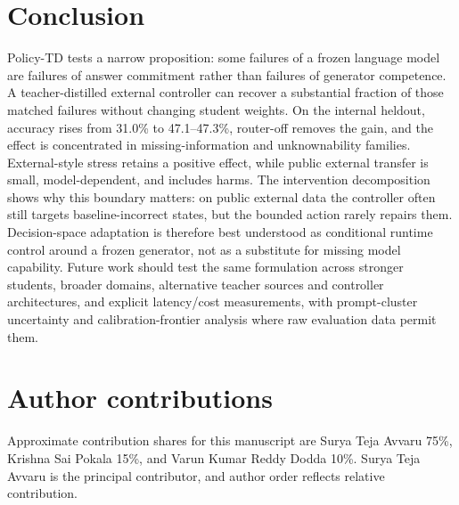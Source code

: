 \documentclass[11pt]{article}
\newcommand{\policytd}{Policy-TD}
\begin{document}
\section{Conclusion}
\policytd{} tests a narrow proposition: some failures of a frozen language model are failures of answer commitment rather than failures of generator competence. A teacher-distilled external controller can recover a substantial fraction of those matched failures without changing student weights. On the internal heldout, accuracy rises from 31.0\% to 47.1--47.3\%, router-off removes the gain, and the effect is concentrated in missing-information and unknownability families. External-style stress retains a positive effect, while public external transfer is small, model-dependent, and includes harms. The intervention decomposition shows why this boundary matters: on public external data the controller often still targets baseline-incorrect states, but the bounded action rarely repairs them. Decision-space adaptation is therefore best understood as conditional runtime control around a frozen generator, not as a substitute for missing model capability. Future work should test the same formulation across stronger students, broader domains, alternative teacher sources and controller architectures, and explicit latency/cost measurements, with prompt-cluster uncertainty and calibration-frontier analysis where raw evaluation data permit them.

\section*{Author contributions}
Approximate contribution shares for this manuscript are Surya Teja Avvaru 75\%, Krishna Sai Pokala 15\%, and Varun Kumar Reddy Dodda 10\%. Surya Teja Avvaru is the principal contributor, and author order reflects relative contribution.
\end{document}
